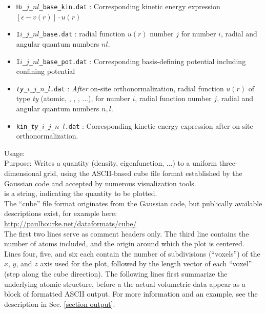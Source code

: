 \begin{itemize}
     radial function $u(r)$
      number $j$ for  number $i$, radial and angular
      quantum numbers $nl$. 
  \item \texttt{H$i$\_$j$\_$nl$\_base\_kin.dat} : Corresponding
    kinetic energy expression $[\epsilon - v(r)]\cdot u(r)$ 
  \item \texttt{I$i$\_$j$\_$nl$\_base.dat} :
     radial function $u(r)$
      number $j$ for  number $i$, radial and angular
      quantum numbers $nl$.   
  \item \texttt{I$i$\_$j$\_$nl$\_base\_pot.dat} : Corresponding
    basis-defining potential including confining potential 
  \item \texttt{\emph{ty}\_$i$\_$j$\_$n$\_$l$.dat} : \emph{After}
    on-site orthonormalization, radial function $u(r)$ of type
    \emph{ty} (atomic, ,
    , , ...),
    for  number $i$, radial function number $j$,
    radial and angular quantum numbers $n,l$.
  \item \texttt{kin\_\emph{ty}\_$i$\_$j$\_$n$\_$l$.dat} :
    Corresponding kinetic energy expression after on-site
    orthonormalization. 
\end{itemize}

{
  \noindent
  Usage:    \\[1.0ex]
  Purpose: Writes a quantity (density, eigenfunction, ...) to a
    uniform three-dimensional grid, using the ASCII-based cube file
    format established by the Gaussian code and accepted by numerous
    visualization tools. \\[1.0ex]
   is a string, indicating the quantity to be plotted. \\
}
The ``cube'' file format originates from the Gaussian code, but
publically available descriptions exist, for example here: \\[1.0ex]
 \url{http://paulbourke.net/dataformats/cube/} \\[1.0ex]
The first two lines serve as comment headers only. The third line
contains the number of atoms included, and the origin around which the
plot is centered. Lines four, five, and six each contain the number of
subdivisions (``voxels'') of the $x$, $y$, and $z$ axis used for the
plot, followed by the length vector of each ``voxel'' (step along the
cube direction). The following lines first summarize the underlying
atomic structure, before a the actual volumetric data appear as a
block of formatted ASCII output. For more information and an example,
see the description in Sec. \ref{section output}.

